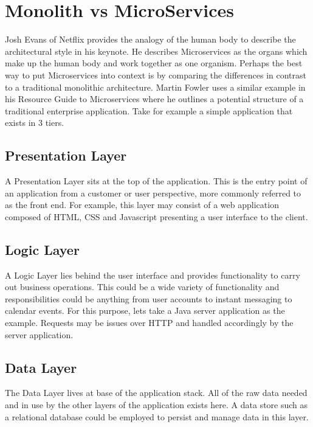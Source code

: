 \documentclass[journal]{IEEEtran}
\begin{document}

\section{Monolith vs MicroServices}

Josh Evans of Netflix provides the analogy of the human body to describe the architectural style in his keynote. \cite{MasteringChaosNetflix} He describes Microservices as the organs which make up the human body and work together as one organism.
Perhaps the best way to put Microservices into context is by comparing the differences in contrast to a traditional monolithic architecture. Martin Fowler uses a similar example in his Resource Guide to Microservices where he outlines a potential structure of a traditional enterprise application. \cite{MicroservicesResourceGuide} Take for example a simple application that exists in 3 tiers.

\subsection{Presentation Layer}
A Presentation Layer sits at the top of the application. This is the entry point of an application from a customer or user perspective, more commonly referred to as the front end. For example, this layer may consist of a web application composed of HTML, CSS and Javascript presenting a user interface to the client. 

\subsection{Logic Layer}
A Logic Layer lies behind the user interface and provides functionality to carry out business operations. This could be a wide variety of functionality and responsibilities could be anything from user accounts to instant messaging to calendar events. For this purpose, lets take a Java server application as the example. Requests may be issues over HTTP and handled accordingly by the server application.

\subsection{Data Layer}
The Data Layer lives at base of the application stack. All of the raw data needed and in use by the other layers of the application exists here. A data store such as a relational database could be employed to persist and manage data in this layer.  
\end{document}
